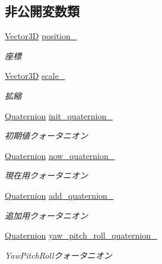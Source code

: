 \subsection*{非公開変数類}
\begin{DoxyCompactItemize}
\item 
\mbox{\hyperlink{class_vector3_d}{Vector3D}} \mbox{\hyperlink{class_transform_aa36f8a9ae39411699f7ff77f017f618a}{position\+\_\+}}
\begin{DoxyCompactList}\small\item\em 座標 \end{DoxyCompactList}\item 
\mbox{\hyperlink{class_vector3_d}{Vector3D}} \mbox{\hyperlink{class_transform_ade54d2d37f01b20758b0ce11def76104}{scale\+\_\+}}
\begin{DoxyCompactList}\small\item\em 拡縮 \end{DoxyCompactList}\item 
\mbox{\hyperlink{_vector3_d_8h_a3ee38c9c46d9851e33a9a1113328dafc}{Quaternion}} \mbox{\hyperlink{class_transform_ac0637721b2a1f2e10dca46caa9a0d77d}{init\+\_\+quaternion\+\_\+}}
\begin{DoxyCompactList}\small\item\em 初期値クォータニオン \end{DoxyCompactList}\item 
\mbox{\hyperlink{_vector3_d_8h_a3ee38c9c46d9851e33a9a1113328dafc}{Quaternion}} \mbox{\hyperlink{class_transform_a00d46dfb43b1e60b4f6ca8728d6aff54}{now\+\_\+quaternion\+\_\+}}
\begin{DoxyCompactList}\small\item\em 現在用クォータニオン \end{DoxyCompactList}\item 
\mbox{\hyperlink{_vector3_d_8h_a3ee38c9c46d9851e33a9a1113328dafc}{Quaternion}} \mbox{\hyperlink{class_transform_a8a646ffca2f737bca6b3ad183b4ce54a}{add\+\_\+quaternion\+\_\+}}
\begin{DoxyCompactList}\small\item\em 追加用クォータニオン \end{DoxyCompactList}\item 
\mbox{\hyperlink{_vector3_d_8h_a3ee38c9c46d9851e33a9a1113328dafc}{Quaternion}} \mbox{\hyperlink{class_transform_ac9985a4b70b9af742c9f26f47784ba7b}{yaw\+\_\+pitch\+\_\+roll\+\_\+quaternion\+\_\+}}
\begin{DoxyCompactList}\small\item\em Yaw\+Pitch\+Rollクォータニオン \end{DoxyCompactList}\item 

\end{DoxyCompactItemize}

